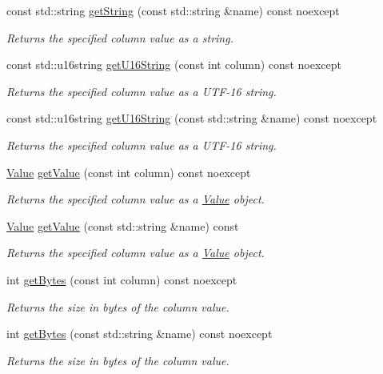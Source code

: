 \begin{DoxyCompactItemize}
const std\-::string \hyperlink{a00010_a44f9f5da46aa91b869fe26a188e803fa}{get\-String} (const std\-::string \&name) const noexcept
\begin{DoxyCompactList}\small\item\em Returns the specified column value as a string. \end{DoxyCompactList}\item 
const std\-::u16string \hyperlink{a00010_a2b48f9e2ffbcfe787d85b4372a7ee29d}{get\-U16\-String} (const int column) const noexcept
\begin{DoxyCompactList}\small\item\em Returns the specified column value as a U\-T\-F-\/16 string. \end{DoxyCompactList}\item 
const std\-::u16string \hyperlink{a00010_ad6024ad6e74ee1ac47ad0ce79f905026}{get\-U16\-String} (const std\-::string \&name) const noexcept
\begin{DoxyCompactList}\small\item\em Returns the specified column value as a U\-T\-F-\/16 string. \end{DoxyCompactList}\item 
\hyperlink{a00015}{Value} \hyperlink{a00010_a41fcbc5da6eb3fe6fc75e4faed208fc6}{get\-Value} (const int column) const noexcept
\begin{DoxyCompactList}\small\item\em Returns the specified column value as a \hyperlink{a00015}{Value} object. \end{DoxyCompactList}\item 
\hyperlink{a00015}{Value} \hyperlink{a00010_ad352a7124ee46d756462c8a1b014599a}{get\-Value} (const std\-::string \&name) const 
\begin{DoxyCompactList}\small\item\em Returns the specified column value as a \hyperlink{a00015}{Value} object. \end{DoxyCompactList}\item 
int \hyperlink{a00010_aeb571e9157ef46c42ed48fc229b7842d}{get\-Bytes} (const int column) const noexcept
\begin{DoxyCompactList}\small\item\em Returns the size in bytes of the column value. \end{DoxyCompactList}\item 
int \hyperlink{a00010_ad183a562774f9590273bf35c6e232a1a}{get\-Bytes} (const std\-::string \&name) const noexcept
\begin{DoxyCompactList}\small\item\em Returns the size in bytes of the column value. \end{DoxyCompactList}\item 

\end{DoxyCompactItemize}
